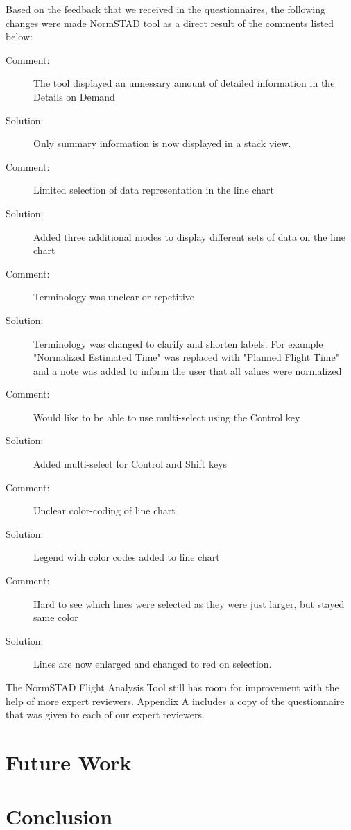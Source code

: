 \documentclass{sig-alternate}
\begin{document}
Based on the feedback that we received in the questionnaires, the following changes
were made NormSTAD tool as a direct result of the comments listed below:
\begin{description}
	\item[Comment: ] The tool displayed an unnessary amount of detailed information
in the Details on Demand
	\item[Solution: ] Only summary information is now displayed in a stack view.
	\item[Comment: ] Limited selection of data representation in the line chart
	\item[Solution: ] Added three additional modes to display different sets of data
on the line chart
	\item[Comment: ] Terminology was unclear or repetitive
	\item[Solution: ] Terminology was changed to clarify and shorten labels. For example
"Normalized Estimated Time" was replaced with "Planned Flight Time" and a note was
added to inform the user that all values were normalized
	\item[Comment: ] Would like to be able to use multi-select using the Control key
	\item[Solution: ] Added multi-select for Control and Shift keys
	\item[Comment: ] Unclear color-coding of line chart
	\item[Solution: ] Legend with color codes added to line chart
	\item[Comment: ] Hard to see which lines were selected as they were just larger, but
stayed same color
	\item[Solution: ] Lines are now enlarged and changed to red on selection.
\end{description}

The NormSTAD Flight Analysis Tool still has room for improvement with the help
of more expert reviewers. Appendix A includes a copy of the questionnaire that 
was given to each of our expert reviewers. 
  
	
\section{Future Work}
\label{sec-future-work}



\section{Conclusion}
\label{sec-conclusion}
\end{document}
